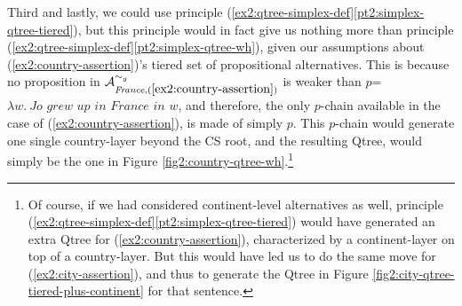 \begin{exe}
	\label{ex2:country-gran-alt2}
\end{exe} 

Third and lastly, we could use principle (\ref{ex2:qtree-simplex-def}\ref{pt2:simplex-qtree-tiered}), but this principle would in fact give us nothing more than principle (\ref{ex2:qtree-simplex-def}\ref{pt2:simplex-qtree-wh}), given our assumptions about (\ref{ex2:country-assertion})'s tiered set of propositional alternatives. This is because no proposition in $\mathcal{A}_{\textit{France}, (\ref{ex2:country-assertion})}^{\sim_g}$ is weaker than $p$=\textit{$\lambda w. \ \textit{Jo grew up in France in $w$}$}, and therefore, the only $p$-chain available in the case of (\ref{ex2:country-assertion}), is made of simply $p$. This $p$-chain would generate one single country-layer beyond the CS root, and the resulting Qtree, would simply be the one in Figure \ref{fig2:country-qtree-wh}.\footnote{Of course, if we had considered continent-level alternatives as well, principle (\ref{ex2:qtree-simplex-def}\ref{pt2:simplex-qtree-tiered}) would have generated an extra Qtree for (\ref{ex2:country-assertion}), characterized by a continent-layer on top of a country-layer. But this would have led us to do the same move for (\ref{ex2:city-assertion}), and thus to generate the Qtree in Figure \ref{fig2:city-qtree-tiered-plus-continent} for that sentence.}

